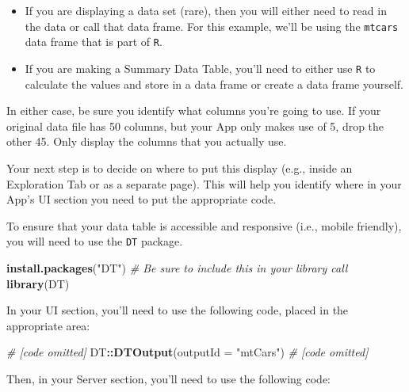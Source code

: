 \documentclass[
]{book}
\newenvironment{Shaded}{\begin{snugshade}}{\end{snugshade}}
\newcommand{\CommentTok}[1]{\textcolor[rgb]{0.56,0.35,0.01}{\textit{#1}}}
\newcommand{\DataTypeTok}[1]{\textcolor[rgb]{0.13,0.29,0.53}{#1}}
\newcommand{\KeywordTok}[1]{\textcolor[rgb]{0.13,0.29,0.53}{\textbf{#1}}}
\newcommand{\NormalTok}[1]{#1}
\newcommand{\OperatorTok}[1]{\textcolor[rgb]{0.81,0.36,0.00}{\textbf{#1}}}
\newcommand{\StringTok}[1]{\textcolor[rgb]{0.31,0.60,0.02}{#1}}
\providecommand{\tightlist}{%
  \setlength{\itemsep}{0pt}\setlength{\parskip}{0pt}}
\begin{document}
\begin{itemize}
\tightlist
\item
  If you are displaying a data set (rare), then you will either need to read in the data or call that data frame. For this example, we'll be using the \texttt{mtcars} data frame that is part of \texttt{R}.
\item
  If you are making a Summary Data Table, you'll need to either use \texttt{R} to calculate the values and store in a data frame or create a data frame yourself.
\end{itemize}

In either case, be sure you identify what columns you're going to use. If your original data file has 50 columns, but your App only makes use of 5, drop the other 45. Only display the columns that you actually use.

Your next step is to decide on where to put this display (e.g., inside an Exploration Tab or as a separate page). This will help you identify where in your App's UI section you need to put the appropriate code.

To ensure that your data table is accessible and responsive (i.e., mobile friendly), you will need to use the \texttt{DT} package.

\begin{Shaded}
\begin{Highlighting}[]
\KeywordTok{install.packages}\NormalTok{(}\StringTok{"DT"}\NormalTok{)}
\CommentTok{# Be sure to include this in your library call}
\KeywordTok{library}\NormalTok{(DT)}
\end{Highlighting}
\end{Shaded}

In your UI section, you'll need to use the following code, placed in the appropriate area:

\begin{Shaded}
\begin{Highlighting}[]
\CommentTok{# [code omitted]}
\NormalTok{DT}\OperatorTok{::}\KeywordTok{DTOutput}\NormalTok{(}\DataTypeTok{outputId =} \StringTok{"mtCars"}\NormalTok{)}
\CommentTok{# [code omitted]}
\end{Highlighting}
\end{Shaded}

Then, in your Server section, you'll need to use the following code:
\end{document}
